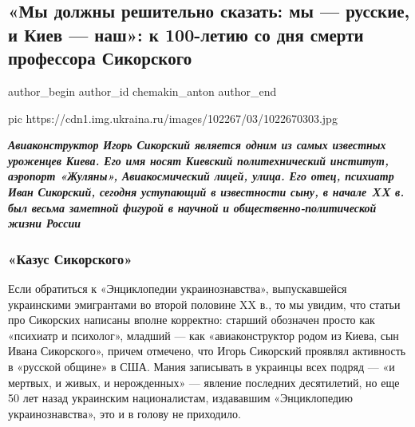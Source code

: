  
 
 
 
 
 
\subsection{«Мы должны решительно сказать: мы — русские, и Киев — наш»: к 100-летию со дня смерти профессора Сикорского}
\label{sec:14_02_2019.news.ru.ukraina_ru.chemakin_anton.1.professor_sikorskii}
\ifcmt
  author_begin
   author_id chemakin_anton
  author_end
\fi


\ifcmt
pic https://cdn1.img.ukraina.ru/images/102267/03/1022670303.jpg
\fi

\begin{leftbar}
  \begingroup
    \em\Large\bfseries\color{blue}
Авиаконструктор Игорь Сикорский является одним из самых известных уроженцев
Киева. Его имя носят Киевский политехнический институт, аэропорт «Жуляны»,
Авиакосмический лицей, улица. Его отец, психиатр Иван Сикорский, сегодня
уступающий в известности сыну, в начале XX в. был весьма заметной фигурой в
научной и общественно-политической жизни России
  \endgroup
\end{leftbar}

\subsubsection{«Казус Сикорского»}

Если обратиться к «Энциклопедии украинознавства», выпускавшейся украинскими
эмигрантами во второй половине XX в., то мы увидим, что статьи про Сикорских
написаны вполне корректно: старший обозначен просто как «психиатр и психолог»,
младший — как «авиаконструктор родом из Киева, сын Ивана Сикорского», причем
отмечено, что Игорь Сикорский проявлял активность в «русской общине» в США.
Мания записывать в украинцы всех подряд — «и мертвых, и живых, и нерожденных» —
явление последних десятилетий, но еще 50 лет назад украинским националистам,
издававшим «Энциклопедию украинознавства», это и в голову не приходило.

